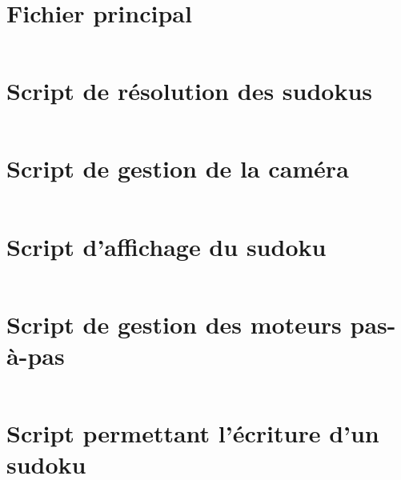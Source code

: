\printbibliography
\nocite{*}
\appendix

\begin{changemargin}{-2cm}{-4cm}

\chapter{Fichier principal}
\label{main}
\inputminted[fontsize=\scriptsize, linenos=true]{Python}{../script/main.py}

\chapter{Script de résolution des sudokus}
\label{resolution}
\inputminted[fontsize=\scriptsize, linenos=true]{Python}{../script/resolution.py}

\chapter{Script de gestion de la caméra}
\label{camera}
\inputminted[fontsize=\scriptsize, linenos=true]{Python}{../script/camera.py}

\chapter{Script d'affichage du sudoku}
\label{display}
\inputminted[fontsize=\scriptsize, linenos=true]{Python}{../script/display.py}

\chapter{Script de gestion des moteurs pas-à-pas}
\label{step_motor}
\inputminted[fontsize=\scriptsize, linenos=true]{Python}{../script/step_motor.py}

\chapter{Script permettant l'écriture d'un sudoku}
\label{write}
\inputminted[fontsize=\scriptsize, linenos=true]{Python}{../script/write.py}


\end{changemargin}
